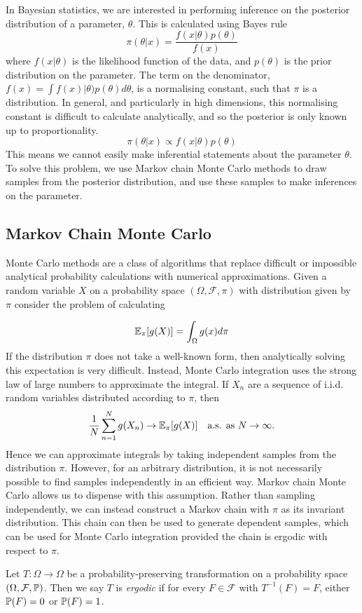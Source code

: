 In Bayesian statistics, we are interested in performing inference on the posterior distribution of a parameter, $\theta$.  This is calculated using Bayes rule
$$
\pi(\theta | x) = \frac{f(x | \theta) p(\theta)}{f(x)}
$$
where $f(x|\theta)$ is the likelihood function of the data, and $p(\theta)$ is the prior distribution on the parameter.  The term on the denominator, $f(x)=\int f(x)|\theta) p(\theta) d\theta$, is a normalising constant, such that $\pi$ is a distribution.  In general, and particularly in high dimensions, this normalising constant is difficult to calculate analytically, and so the posterior is only known up to proportionality.
$$
\pi(\theta | x) \propto f(x | \theta) p(\theta)
$$
This means we cannot easily make inferential statements about the parameter $\theta$.  To solve this problem, we use Markov chain Monte Carlo methods to draw samples from the posterior distribution, and use these samples to make inferences on the parameter.

\subsection{Markov Chain Monte Carlo}
Monte Carlo methods are a class of algorithms that replace difficult or impossible analytical probability calculations with numerical approximations.  Given a random variable $X$ on a probability space $(\Omega,\mathcal{F}, \pi)$ with distribution given by $\pi$ consider the problem of calculating

$$
\E_\pi[g(X)] = \int_\Omega g(x) d \pi
$$
If the distribution $\pi$ does not take a well-known form, then analytically solving this expectation is very difficult.  Instead, Monte Carlo integration uses the strong law of large numbers to approximate the integral.  If $X_n$ are a sequence of i.i.d. random variables distributed according to $\pi$, then
$$
\frac{1}{N} \sum_{n=1}^N g(X_n) \to \E_\pi[g(X)] \quad \text{a.s. as $N \to \infty$.}
$$
Hence we can approximate integrals by taking independent samples from the distribution $\pi$.  However, for an arbitrary distribution, it is not necessarily possible to find samples independently in an efficient way.  Markov chain Monte Carlo allows us to dispense with this assumption.  Rather than sampling independently, we can instead construct a Markov chain with $\pi$ as its invariant distribution.  This chain can then be used to generate dependent samples, which can be used for Monte Carlo integration provided the chain is ergodic with respect to $\pi$.

\begin{defn}[Ergodicity]
Let $T:\Omega \to \Omega$ be a probability-preserving transformation on a probability space $(\Omega,\mathcal{F}, \P)$.  Then we say $T$ is \emph{ergodic} if for every $F \in \mathcal{F}$ with $T^{-1}(F)=F$, either $\P(F)=0$ or $\P(F)=1$.
\end{defn}

